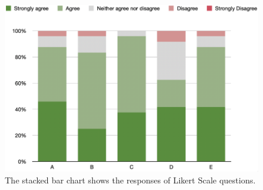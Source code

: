     {
        \begin{figure}[b!]
            \centering
            \includegraphics[width=\columnwidth,keepaspectratio]{figure/evaluation/likert.png}
            \caption{The stacked bar chart shows the responses of Likert Scale questions.}
            \label{fig:likert}
        \end{figure}
    }